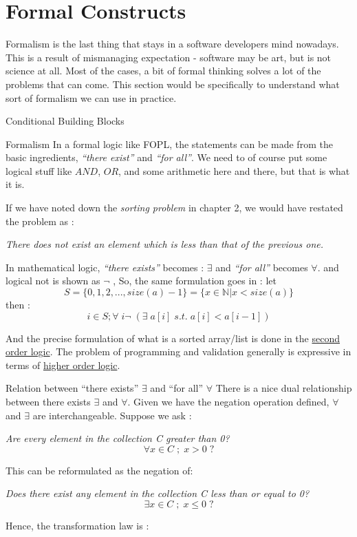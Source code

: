 \chapter{Formal Constructs}\label{using-predicates}

{\LARGE F}ormalism is the last thing that stays in a software developers mind nowadays. This is a result of mismanaging expectation - software may be art, but is not science at all. Most of the cases, a bit of formal thinking solves a lot of the problems that can come.
This section would be specifically to understand what sort of formalism we can use in practice.

\begin{section}{Conditional Building Blocks}

\begin{subsection}{Formalism}
In a formal logic like FOPL, the statements can be made from the basic ingredients, 
\emph{``there exist''} and \emph{``for all''}. We need to of course put some logical stuff like $AND$, $OR$,
and some arithmetic here and there, but that is what it is.

If we have noted down the \emph{sorting problem} in chapter 2, we would have restated the problem as :

\begin{center}
\emph{ There does not exist an element which is less than that of the previous one. }
\end{center} 

In mathematical logic, \emph{``there exists''} becomes : $\exists$ and \emph{``for all''} becomes $\forall$.
and logical not is shown as $\neg$ ,  So, the same formulation goes in : let 
$$
S = \{ 0, 1, 2, ... , size(a)-1  \} =  \{  x \in \mathbb{N} | x < size(a) \} 
$$
then :
$$
  i \in S ; \forall \; i  \neg \; ( \exists \; a[i] \; s.t. \; a[i] < a[i-1]    ) 
$$ 

And the precise formulation of what is a sorted array/list is done in the 
\href{https://en.wikipedia.org/wiki/Second-order_logic}{second order logic}.
The problem of programming and validation generally is expressive in terms of 
\href{https://en.wikipedia.org/wiki/Higher-order_logic}{higher order logic}.
\end{subsection}
\begin{subsection}{Relation between ``there exists'' $\exists$ and ``for all'' $\forall$ }
There is a nice dual relationship between there exists $\exists$ and $\forall$.
Given we have the negation operation defined, $\forall$ and $\exists$  are interchangeable.
Suppose we ask :  
\begin{center}
\emph{ Are every element in the collection C greater than 0? }
$$
\forall x \in C \; ; \; x > 0 \; ?
$$
\end{center}
This can be reformulated as the negation of:
\begin{center}
\emph{ Does there exist any element in the collection C less than or equal to 0? }
$$
\exists x \in C \; ; \; x \le 0 \; ?
$$
\end{center}
Hence, the transformation law is :


\end{subsection}
\end{section}
